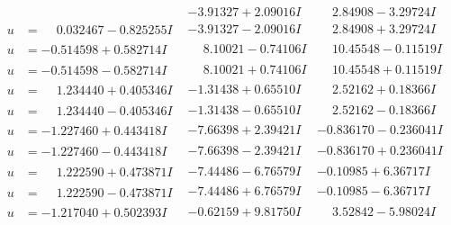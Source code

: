 \documentclass[1p]{elsarticle_modified}
\theoremstyle{definition}
\begin{document}
$$\begin{array}{c|c|c}
 & -3.91327 + 2.09016 I & \phantom{-}2.84908 - 3.29724 I \\ \hline\begin{aligned}
u &= \phantom{-}0.032467 - 0.825255 I\end{aligned}
 & -3.91327 - 2.09016 I & \phantom{-}2.84908 + 3.29724 I \\ \hline\begin{aligned}
u &= -0.514598 + 0.582714 I\end{aligned}
 & \phantom{-}8.10021 - 0.74106 I & \phantom{-}10.45548 - 0.11519 I \\ \hline\begin{aligned}
u &= -0.514598 - 0.582714 I\end{aligned}
 & \phantom{-}8.10021 + 0.74106 I & \phantom{-}10.45548 + 0.11519 I \\ \hline\begin{aligned}
u &= \phantom{-}1.234440 + 0.405346 I\end{aligned}
 & -1.31438 + 0.65510 I & \phantom{-}2.52162 + 0.18366 I \\ \hline\begin{aligned}
u &= \phantom{-}1.234440 - 0.405346 I\end{aligned}
 & -1.31438 - 0.65510 I & \phantom{-}2.52162 - 0.18366 I \\ \hline\begin{aligned}
u &= -1.227460 + 0.443418 I\end{aligned}
 & -7.66398 + 2.39421 I & -0.836170 - 0.236041 I \\ \hline\begin{aligned}
u &= -1.227460 - 0.443418 I\end{aligned}
 & -7.66398 - 2.39421 I & -0.836170 + 0.236041 I \\ \hline\begin{aligned}
u &= \phantom{-}1.222590 + 0.473871 I\end{aligned}
 & -7.44486 - 6.76579 I & -0.10985 + 6.36717 I \\ \hline\begin{aligned}
u &= \phantom{-}1.222590 - 0.473871 I\end{aligned}
 & -7.44486 + 6.76579 I & -0.10985 - 6.36717 I \\ \hline\begin{aligned}
u &= -1.217040 + 0.502393 I\end{aligned}
 & -0.62159 + 9.81750 I & \phantom{-}3.52842 - 5.98024 I \\ \hline\begin{aligned}

\end{aligned}
\end{array}$$
\end{document}
